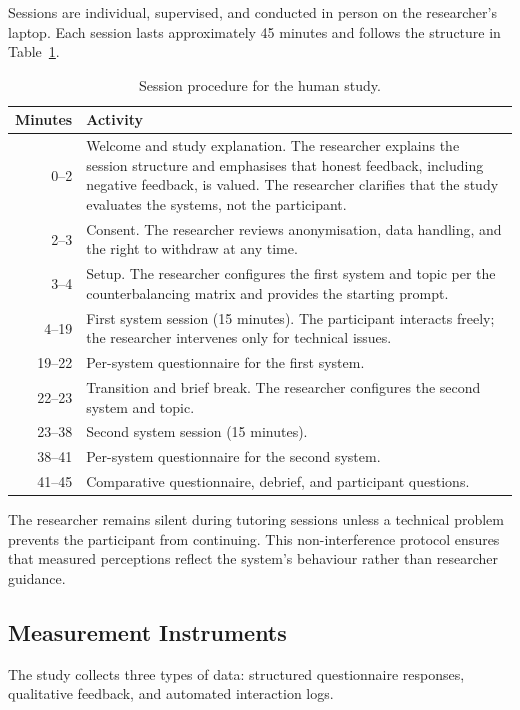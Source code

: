 \documentclass[logo,bsc,singlespacing,parskip,online]{infthesis}
\begin{document}
Sessions are individual, supervised, and conducted in person on the researcher's laptop. Each session lasts approximately 45 minutes and follows the structure in Table~\ref{tab:procedure}.

\begin{table}[ht]
\centering
\caption{Session procedure for the human study.}
\label{tab:procedure}
\begin{tabular}{rp{10cm}}
\toprule
\textbf{Minutes} & \textbf{Activity} \\
\midrule
0--2 & Welcome and study explanation. The researcher explains the session structure and emphasises that honest feedback, including negative feedback, is valued. The researcher clarifies that the study evaluates the systems, not the participant. \\
2--3 & Consent. The researcher reviews anonymisation, data handling, and the right to withdraw at any time. \\
3--4 & Setup. The researcher configures the first system and topic per the counterbalancing matrix and provides the starting prompt. \\
4--19 & First system session (15 minutes). The participant interacts freely; the researcher intervenes only for technical issues. \\
19--22 & Per-system questionnaire for the first system. \\
22--23 & Transition and brief break. The researcher configures the second system and topic. \\
23--38 & Second system session (15 minutes). \\
38--41 & Per-system questionnaire for the second system. \\
41--45 & Comparative questionnaire, debrief, and participant questions. \\
\bottomrule
\end{tabular}
\end{table}

The researcher remains silent during tutoring sessions unless a technical problem prevents the participant from continuing. This non-interference protocol ensures that measured perceptions reflect the system's behaviour rather than researcher guidance.

\subsection{Measurement Instruments}

The study collects three types of data: structured questionnaire responses, qualitative feedback, and automated interaction logs.
\end{document}
